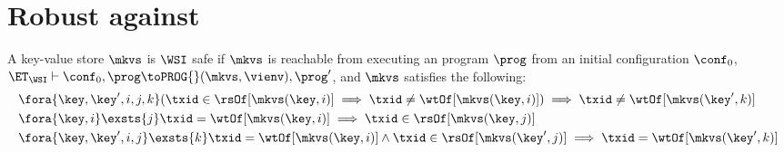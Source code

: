 \section{Robust against \WSI}
\begin{definition}
    \label{def:wsi-safe}
    A key-value store \( \mkvs \) is \(\WSI\) safe if \( \mkvs \) is 
    reachable from executing an program \( \prog \) from an initial configuration \( \conf_0 \),
    \ie \( \ET_\WSI \vdash \conf_0, \prog \toPROG{} (\mkvs, \vienv), \prog' \),
    and \( \mkvs \) satisfies the following:
    \begin{align}
         & \fora{\key, \key',i,j,k} ( \txid \in \rsOf[\mkvs(\key,i)] \implies \txid \neq \wtOf[\mkvs(\key,i)] ) \implies \txid \neq \wtOf[\mkvs(\key',k)] \label{equ:wsi-safe-read-only} \\
         & \fora{\key,i} \exsts{j} \txid = \wtOf[\mkvs(\key,i)] \implies \txid \in \rsOf[\mkvs(\key,j)] \label{equ:wsi-safe-write-must-read} \\
         & \fora{\key,\key',i, j} \exsts{k} \txid = \wtOf[\mkvs(\key,i)] \land \txid \in \rsOf[\mkvs(\key',j)] \implies \txid = \wtOf[\mkvs(\key',k)] \label{equ:wsi-safe-all-write}
    \end{align}
\end{definition}


